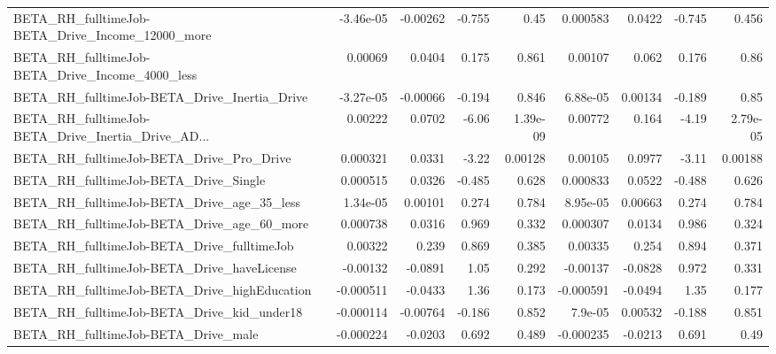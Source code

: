 \begin{tabular}{lrrrrrrrr}
BETA\_RH\_fulltimeJob-BETA\_Drive\_Income\_12000\_more   &   -3.46e-05 &     -0.00262 &   -0.755 &     0.45 &   0.000583 &      0.0422 &       -0.745 &         0.456 \\
BETA\_RH\_fulltimeJob-BETA\_Drive\_Income\_4000\_less    &     0.00069 &       0.0404 &    0.175 &    0.861 &    0.00107 &       0.062 &        0.176 &          0.86 \\
BETA\_RH\_fulltimeJob-BETA\_Drive\_Inertia\_Drive       &   -3.27e-05 &     -0.00066 &   -0.194 &    0.846 &   6.88e-05 &     0.00134 &       -0.189 &          0.85 \\
BETA\_RH\_fulltimeJob-BETA\_Drive\_Inertia\_Drive\_AD... &     0.00222 &       0.0702 &    -6.06 & 1.39e-09 &    0.00772 &       0.164 &        -4.19 &      2.79e-05 \\
BETA\_RH\_fulltimeJob-BETA\_Drive\_Pro\_Drive           &    0.000321 &       0.0331 &    -3.22 &  0.00128 &    0.00105 &      0.0977 &        -3.11 &       0.00188 \\
BETA\_RH\_fulltimeJob-BETA\_Drive\_Single              &    0.000515 &       0.0326 &   -0.485 &    0.628 &   0.000833 &      0.0522 &       -0.488 &         0.626 \\
BETA\_RH\_fulltimeJob-BETA\_Drive\_age\_35\_less         &    1.34e-05 &      0.00101 &    0.274 &    0.784 &   8.95e-05 &     0.00663 &        0.274 &         0.784 \\
BETA\_RH\_fulltimeJob-BETA\_Drive\_age\_60\_more         &    0.000738 &       0.0316 &    0.969 &    0.332 &   0.000307 &      0.0134 &        0.986 &         0.324 \\
BETA\_RH\_fulltimeJob-BETA\_Drive\_fulltimeJob         &     0.00322 &        0.239 &    0.869 &    0.385 &    0.00335 &       0.254 &        0.894 &         0.371 \\
BETA\_RH\_fulltimeJob-BETA\_Drive\_haveLicense         &    -0.00132 &      -0.0891 &     1.05 &    0.292 &   -0.00137 &     -0.0828 &        0.972 &         0.331 \\
BETA\_RH\_fulltimeJob-BETA\_Drive\_highEducation       &   -0.000511 &      -0.0433 &     1.36 &    0.173 &  -0.000591 &     -0.0494 &         1.35 &         0.177 \\
BETA\_RH\_fulltimeJob-BETA\_Drive\_kid\_under18         &   -0.000114 &     -0.00764 &   -0.186 &    0.852 &    7.9e-05 &     0.00532 &       -0.188 &         0.851 \\
BETA\_RH\_fulltimeJob-BETA\_Drive\_male                &   -0.000224 &      -0.0203 &    0.692 &    0.489 &  -0.000235 &     -0.0213 &        0.691 &          0.49 \\

\end{tabular}
